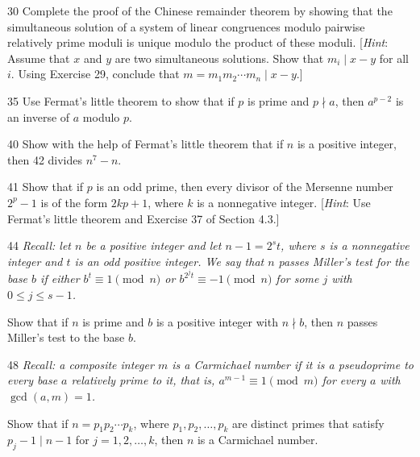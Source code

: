 \documentclass[11pt]{article}
\begin{document}
\begin{exercise}{30}
    Complete the proof of the Chinese remainder theorem by showing
    that the simultaneous solution of a system of linear
    congruences modulo pairwise relatively prime moduli is unique
    modulo the product of these moduli.
    [\emph{Hint}: Assume that $x$ and $y$ are two simultaneous
    solutions. Show that $m_i \mid x - y$ for all $i$. Using
    Exercise 29, conclude that $m = m_1 m_2 \cdots m_n \mid x - y$.]
\end{exercise}

\begin{exercise}{35}
    Use Fermat's little theorem to show that if $p$ is prime and
    $p \nmid a$, then $a^{p-2}$ is an inverse of $a$ modulo $p$.
\end{exercise}

\begin{exercise}{40}
    Show with the help of Fermat's little theorem that if $n$ is a
    positive integer, then 42 divides $n^7 - n$.
\end{exercise}

\begin{exercise}{41}
    Show that if $p$ is an odd prime, then every divisor of the
    Mersenne number $2^p - 1$ is of the form $2kp + 1$, where $k$ is
    a nonnegative integer.
    [\emph{Hint}: Use Fermat's little theorem and Exercise 37 of
    Section 4.3.]
\end{exercise}

\begin{exercise}{44}
    \textit{Recall: let $n$ be a positive integer and let
    $n - 1 = 2^s t$, where $s$ is a nonnegative integer and $t$ is an
    odd positive integer. We say that $n$ passes \emph{Miller's
    test} for the base $b$ if either $b^t \equiv 1 \pmod{n}$ or
    $b^{2^j t} \equiv -1 \pmod{n}$ for some $j$ with
    $0 \leq j \leq s-1$.}

    Show that if $n$ is prime and $b$ is a positive integer with
    $n \nmid b$, then $n$ passes Miller's test to the base $b$.
\end{exercise}

\begin{exercise}{48}
    \textit{Recall: a composite integer $m$ is a \emph{Carmichael
    number} if it is a pseudoprime to every base $a$ relatively
    prime to it, that is, $a^{m-1} \equiv 1 \pmod{m}$ for every $a$
    with $\gcd(a,m) = 1$.}

    Show that if $n = p_1 p_2 \cdots p_k$, where $p_1, p_2, \dots,
    p_k$ are distinct primes that satisfy $p_j - 1 \mid n - 1$ for
    $j = 1, 2, \dots, k$, then $n$ is a Carmichael number.
\end{exercise}
\end{document}
